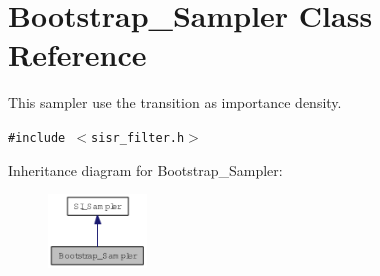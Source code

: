 \hypertarget{class_bootstrap___sampler}{
\section{Bootstrap\_\-Sampler Class Reference}
\label{class_bootstrap___sampler}
}
This sampler use the transition as importance density.  


{\tt \#include $<$sisr\_\-filter.h$>$}

Inheritance diagram for Bootstrap\_\-Sampler:\nopagebreak
\begin{figure}[H]
\begin{center}
\leavevmode
\includegraphics[width=74pt]{class_bootstrap___sampler__inherit__graph}
\end{center}
\end{figure}
